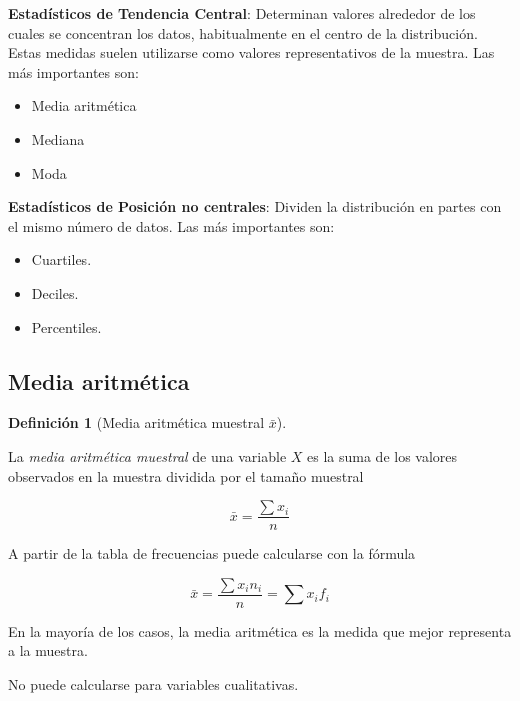 \documentclass[
  a4paper,
]{scrreport}
\providecommand{\tightlist}{%
  \setlength{\itemsep}{0pt}\setlength{\parskip}{0pt}}\usepackage{longtable,booktabs,array}
\theoremstyle{plain}
\theoremstyle{definition}
\newtheorem{definition}{Definición}[chapter]
\theoremstyle{definition}
\theoremstyle{remark}
\begin{document}
\textbf{Estadísticos de Tendencia Central}: Determinan valores alrededor
de los cuales se concentran los datos, habitualmente en el centro de la
distribución. Estas medidas suelen utilizarse como valores
representativos de la muestra. Las más importantes son:

\begin{itemize}
\tightlist
\item
  Media aritmética
\item
  Mediana
\item
  Moda
\end{itemize}

\textbf{Estadísticos de Posición no centrales}: Dividen la distribución
en partes con el mismo número de datos. Las más importantes son:

\begin{itemize}
\tightlist
\item
  Cuartiles.
\item
  Deciles.
\item
  Percentiles.
\end{itemize}

\subsection{Media aritmética}\label{media-aritmuxe9tica}

\begin{definition}[Media aritmética muestral
\(\bar{x}\)]\protect\hypertarget{def-media-aritmetica}{}\label{def-media-aritmetica}

La \emph{media aritmética muestral} de una variable \(X\) es la suma de
los valores observados en la muestra dividida por el tamaño muestral

\[\bar{x} = \frac{\sum x_i}{n}\]

\end{definition}

A partir de la tabla de frecuencias puede calcularse con la fórmula

\[\bar{x} = \frac{\sum x_in_i}{n} = \sum x_i f_i\]

En la mayoría de los casos, la media aritmética es la medida que mejor
representa a la muestra.

\begin{tcolorbox}[enhanced jigsaw, bottomtitle=1mm, breakable, coltitle=black, opacitybacktitle=0.6, toptitle=1mm, rightrule=.15mm, titlerule=0mm, left=2mm, bottomrule=.15mm, colframe=quarto-callout-warning-color-frame, arc=.35mm, title=\textcolor{quarto-callout-warning-color}{\faExclamationTriangle}\hspace{0.5em}{Advertencia}, leftrule=.75mm, colback=white, toprule=.15mm, opacityback=0, colbacktitle=quarto-callout-warning-color!10!white]

No puede calcularse para variables cualitativas.

\end{tcolorbox}
\end{document}
